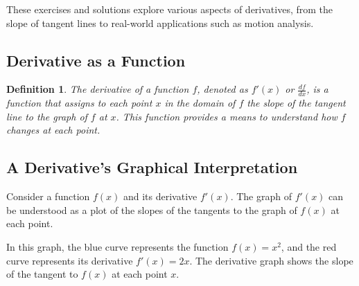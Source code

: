 \documentclass[a4paper,12pt]{book}
\newcounter{example}
\newtheorem{definition}{Definition}
\begin{document}
These exercises and solutions explore various aspects of derivatives, from the slope of tangent lines to real-world applications such as motion analysis.

\subsection{Derivative as a Function}

\begin{definition}
The derivative of a function \( f \), denoted as \( f'(x) \) or \( \frac{df}{dx} \), is a function that assigns to each point \( x \) in the domain of \( f \) the slope of the tangent line to the graph of \( f \) at \( x \). This function provides a means to understand how \( f \) changes at each point.
\end{definition}

\subsection{A Derivative's Graphical Interpretation}
Consider a function \( f(x) \) and its derivative \( f'(x) \). The graph of \( f'(x) \) can be understood as a plot of the slopes of the tangents to the graph of \( f(x) \) at each point.


\begin{center}
\end{center}

In this graph, the blue curve represents the function \( f(x) = x^2 \), and the red curve represents its derivative \( f'(x) = 2x \). The derivative graph shows the slope of the tangent to \( f(x) \) at each point \( x \).
\end{document}
